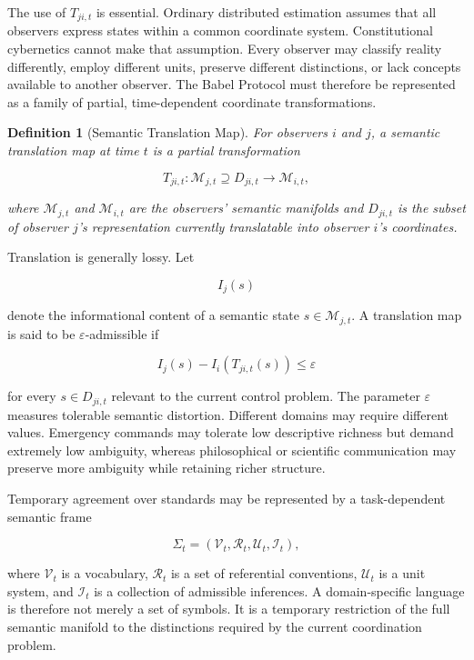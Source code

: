 \documentclass[12pt,a4paper]{article}
\newtheorem{definition}{Definition}
\begin{document}
The use of \(T_{ji,t}\) is essential. Ordinary distributed estimation assumes that all observers express states within a common coordinate system. Constitutional cybernetics cannot make that assumption. Every observer may classify reality differently, employ different units, preserve different distinctions, or lack concepts available to another observer. The Babel Protocol must therefore be represented as a family of partial, time-dependent coordinate transformations.

\begin{definition}[Semantic Translation Map]
For observers \(i\) and \(j\), a semantic translation map at time \(t\) is a partial transformation

\[
T_{ji,t}:
\mathcal{M}_{j,t}
\supseteq
D_{ji,t}
\rightarrow
\mathcal{M}_{i,t},
\]

where \(\mathcal{M}_{j,t}\) and \(\mathcal{M}_{i,t}\) are the observers' semantic manifolds and \(D_{ji,t}\) is the subset of observer \(j\)'s representation currently translatable into observer \(i\)'s coordinates.
\end{definition}

Translation is generally lossy. Let

\[
I_j(s)
\]

denote the informational content of a semantic state \(s\in\mathcal{M}_{j,t}\). A translation map is said to be \(\varepsilon\)-admissible if

\[
I_j(s)
-
I_i\left(T_{ji,t}(s)\right)
\leq
\varepsilon
\]

for every \(s\in D_{ji,t}\) relevant to the current control problem. The parameter \(\varepsilon\) measures tolerable semantic distortion. Different domains may require different values. Emergency commands may tolerate low descriptive richness but demand extremely low ambiguity, whereas philosophical or scientific communication may preserve more ambiguity while retaining richer structure.

Temporary agreement over standards may be represented by a task-dependent semantic frame

\[
\Sigma_t
=
\left(
\mathcal{V}_t,
\mathcal{R}_t,
\mathcal{U}_t,
\mathcal{I}_t
\right),
\]

where \(\mathcal{V}_t\) is a vocabulary, \(\mathcal{R}_t\) is a set of referential conventions, \(\mathcal{U}_t\) is a unit system, and \(\mathcal{I}_t\) is a collection of admissible inferences. A domain-specific language is therefore not merely a set of symbols. It is a temporary restriction of the full semantic manifold to the distinctions required by the current coordination problem.
\end{document}

